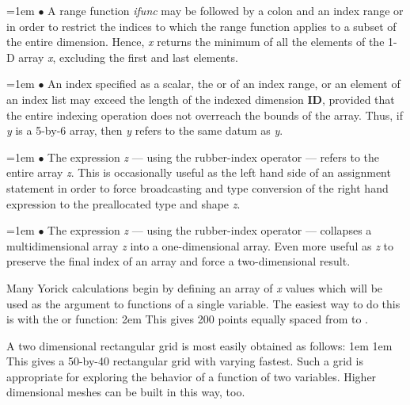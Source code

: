 \hangindent=1em
$\bullet$ A range function {\it ifunc} may be followed by a colon and an
index range  or  in order to restrict
the indices to which the range function applies to a subset of the entire
dimension.  Hence, {\it x\/} returns the minimum of all
the elements of the 1-D array {\it x}, excluding the first and last elements.

\hangindent=1em
$\bullet$ An index specified as a scalar, the  or  of
an index range, or an element of an index list may exceed the length of the
indexed dimension {\bf ID}, provided that the entire indexing operation does
not overreach the bounds of the array.  Thus, if {\it y\/} is a 5-by-6 array,
then {\it y\/} refers to the same datum as  {\it y\/}.

\hangindent=1em
$\bullet$ The expression {\it z\/} --- using the rubber-index
operator  --- refers to the entire array {\it z\/}.  This is
occasionally useful as the left hand side of an assignment statement in
order to force broadcasting and type conversion of the right hand
expression to the preallocated type and shape {\it z\/}.

\hangindent=1em
$\bullet$ The expression {\it z\/}\kbd{(*)} --- using the rubber-index
operator \kbd{*} --- collapses a multidimensional array {\it z\/} into
a one-dimensional array.  Even more useful as {\it z\/}\kbd{(*,)} to
preserve the final index of an array and force a two-dimensional result.


Many Yorick calculations begin by defining an array of {\it x\/} values
which will be used as the argument to functions of a single variable.
The easiest way to do this is with the  or  function:
\begindemo
\hglue2em 
\enddemo
This gives 200 points equally spaced from  to .

A two dimensional rectangular grid is most easily obtained as follows:
\begindemo
\hglue1em 
\hglue1em 
\enddemo
This gives a 50-by-40 rectangular grid with  varying fastest.
Such a grid is appropriate for exploring the behavior of a function of
two variables.  Higher dimensional meshes can be built in this way, too.

\copyrightnotice

